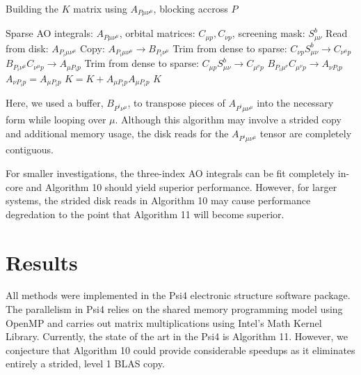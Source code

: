 \begin{algorithm}[H]
\caption{Building the $K$ matrix using $A_{P \mu \nu^\mu}$, blocking accross $P$}
\begin{algorithmic}
\REQUIRE Sparse AO integrals: $A_{P \mu \nu^\mu}$, orbital matrices: $C_{\mu p}, C_{\nu p}$, screening mask: $S_{\mu \nu}^b$
    \STATE Read from disk: $A_{P_i \mu \nu^{\mu}}$
        \STATE Copy: $A_{P_i \mu \nu^{\mu}} \rightarrow B_{P_i \nu^{\mu}}$
        \STATE Trim from dense to sparse: $C_{\nu p}S_{\mu \nu}^b \rightarrow C_{\nu^{\mu} p}$
        \STATE $B_{P_i \nu^{\mu}} C_{\nu^{\mu} p} \rightarrow A_{\mu P_i p}$
            \STATE Trim from dense to sparse: $C_{\mu p}S_{\mu \nu}^b \rightarrow C_{\mu^{\nu} p}$
            \STATE $B_{P_i \mu^{\nu}} C_{\mu^{\nu} p} \rightarrow A_{\nu P_i p}$
        \ELSE
            \STATE $A_{\nu P_i p} = A_{\mu P_i p}$ 
        \ENDIF
    \ENDFOR
    \STATE $K = K +  A_{\mu P_i p} A_{\mu P_i p} $
\ENDFOR
\RETURN $K$
\end{algorithmic}
\end{algorithm}

\noindent Here, we used a buffer, $B_{P^i \nu^{\mu}}$, to transpose pieces of $A_{P^i \mu \nu^{\mu}}$ into the necessary form
while looping over $\mu$.
Although this algorithm may involve a strided copy and additional memory usage, the disk reads for the $A_{P^i \mu \nu^{\mu}}$ 
tensor are completely contiguous.  

For smaller investigations, the three-index AO integrals can be fit completely in-core and Algorithm 10 should yield superior 
performance. However, for larger systems,
the strided disk reads in Algorithm 10 may cause performance degredation to the point that Algorithm 11 will become superior.


\section{Results}

All methods were implemented in the {\sc Psi4} electronic structure software package.
The parallelism in {\sc Psi4} relies on the shared memory programming model using OpenMP 
and carries out matrix multiplications using Intel's Math Kernel
Library. Currently, the state of the art in the 
Psi4 is Algorithm 11. However, we conjecture that Algorithm 10 could provide 
considerable speedups as it eliminates entirely a strided, level 1 BLAS copy.   

